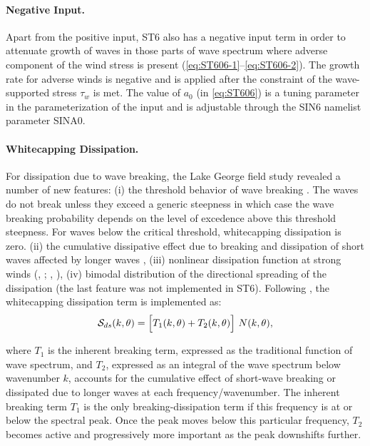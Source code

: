 \paragraph{Negative Input.} Apart from the positive input, {\code ST6} also has a
negative input term in order to attenuate growth of waves in those parts
of wave spectrum where adverse component of the wind stress is present
(\ref{eq:ST606-1}--\ref{eq:ST606-2}). The growth rate for adverse winds
is negative \citep{pro:Don99} and is applied after the constraint of
the wave-supported stress $\tau_w$ is met. The value of $a_0$
(in \ref{eq:ST606}) is a tuning parameter in the parameterization of the
input and is adjustable through the {\F SIN6} namelist parameter {\code  SINA0}.


\noindent
\paragraph{Whitecapping Dissipation.} For dissipation due to wave breaking,
the Lake George field study revealed a number of new features: (i) the
threshold behavior of wave breaking \citep{art:BBY01}. The waves do not
break unless they exceed a generic steepness in which case the wave breaking
probability depends on the level of excedence above this threshold steepness.
For waves below the critical threshold, whitecapping dissipation is zero.
(ii) the cumulative dissipative effect due to breaking and dissipation of
short waves affected by longer waves
\citep{pro:Don01,pro:BY05,art:Mea06,art:YB06,art:Bea10},
(iii) nonlinear dissipation function at strong winds
(\citeauthor{art:Mea06}, \citeyear{art:Mea06};\linebreak
 \citeauthor{art:Bea07}, \citeyear{art:Bea07}),
(iv) bimodal distribution of the directional spreading of the dissipation
\citep{art:YB06,art:Bea10} (the last feature was not implemented in {\code ST6}).
Following \citet{art:RBW12}, the whitecapping dissipation term is
implemented as:
\begin{equation}\label{eq:ST620}
  \cS_{ds}(k,\theta) = \Bigl [ T_1(k,\theta) + T_2(k,\theta) \Bigr ]\ N(k,\theta) ,
\end{equation}

\noindent
where $T_1$ is the inherent breaking term, expressed as the traditional function
of wave spectrum, and $T_2$, expressed as an integral of the wave spectrum below
wavenumber $k$, accounts for the cumulative effect of short-wave breaking or
dissipated due to longer waves at each frequency/wavenumber. The inherent breaking
term $T_1$ is the only breaking-dissipation term if this frequency is at or below
the spectral peak. Once the peak moves below this particular frequency, $T_2$
becomes active and progressively more important as the peak downshifts further.

